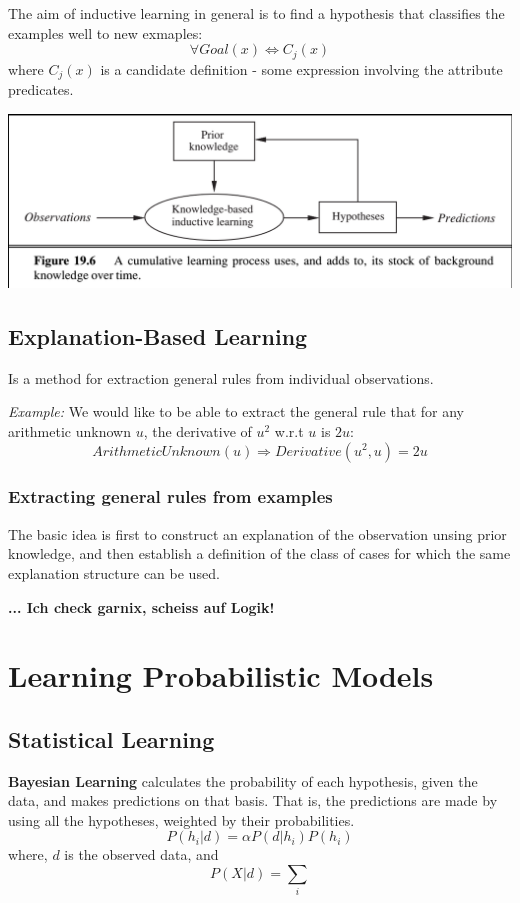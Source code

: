 \documentclass{scrartcl}
\begin{document}
The aim of inductive learning in general is to find a hypothesis that classifies the examples well to new exmaples:
\[\forall Goal(x) \Leftrightarrow C_j(x)\]
where \(C_j(x)\) is a candidate definition - some expression involving the attribute predicates.

\begin{center}
    \includegraphics[scale=0.4]{img/cumlearn.png}
\end{center}

\subsection{Explanation-Based Learning}
Is a method for extraction general rules from individual observations.

\textit{Example:} We would like to be able to extract the general rule that for any arithmetic unknown \(u\), the derivative of \(u^2\) w.r.t \(u\) is \(2u\):
\[ArithmeticUnknown(u) \Rightarrow Derivative(u^2, u) = 2u\]  
\subsubsection{Extracting general rules from examples}
The basic idea is first to construct an explanation of the observation unsing prior knowledge, and then establish a definition of the class of cases for which the same explanation structure can be used.

\textbf{... Ich check garnix, scheiss auf Logik!}

\section{Learning Probabilistic Models}
\subsection{Statistical Learning}
\textbf{Bayesian Learning} calculates the probability of each hypothesis, given the data, and makes predictions on that basis. That is, the predictions are made by using all the hypotheses, weighted by their probabilities.
\[P(h_i | d) = \alpha P(d|h_i) P(h_i)\]
where, \(d\) is the observed data, and
\[P(X | d) = \sum_i \]
\end{document}
